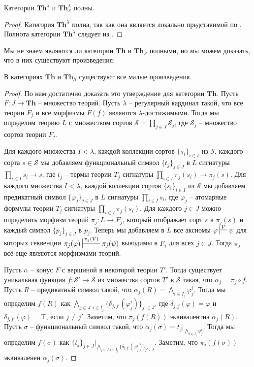 \documentclass[reqno]{amsart}
\theoremstyle{definition}
\theoremstyle{remark}
\newcommand{\bcat}[1]{\mathbf{#1}}
\newcommand{\Th}{\bcat{Th}}
\begin{document}
\begin{prop}
Категории $\Th^\lambda$ и $\Th_\mathcal{S}^\lambda$ полны.
\end{prop}
\begin{proof}
Категория $\Th^\lambda$ полна, так как она является локально представимой по .
Полнота категории $\Th^\lambda$ следует из .
\end{proof}

Мы не знаем являются ли категории $\Th$ и $\Th_\mathcal{S}$ полными, но мы можем доказать, что в них существуют произведения:

\begin{prop}
В категориях $\Th$ и $\Th_\mathcal{S}$ существуют все малые произведения.
\end{prop}
\begin{proof}
По  нам достаточно доказать это утверждение для категории $\Th$.
Пусть $F : J \to \Th$ -- множество теорий.
Пусть $\lambda$ -- регулярный кардинал такой, что все теории $F_j$ и все морфизмы $F(f)$ являются $\lambda$-достижимыми.
Тогда мы определим теорию $L$ с множеством сортов $\mathcal{S} = \prod_{j \in J} \mathcal{S}_j$, где $\mathcal{S}_j$ -- множество сортов теории $F_j$.

Для каждого множества $I < \lambda$, каждой коллекции сортов $\{ s_i \}_{i \in I}$ из $\mathcal{S}$, каждого сорта $s \in \mathcal{S}$ мы добавляем функциональный символ $\{ t_j \}_{j \in J}$ в $L$ сигнатуры $\prod_{i \in I} s_i \to s$,
где $t_j$ -- термы теории $T_j$ сигнатуры $\prod_{i \in I} \pi_j(s_i) \to \pi_j(s)$.
Для каждого множества $I < \lambda$, каждой коллекции сортов $\{ s_i \}_{i \in I}$ из $\mathcal{S}$ мы добавляем предикатный символ $\{ \varphi_j \}_{j \in J}$ в $L$ сигнатуры $\prod_{i \in I} s_i$,
где $\varphi_j$ -- атомарные формулы теории $T_j$ сигнатуры $\prod_{i \in I} \pi_j(s_i)$.
Для каждого $j \in J$ можно определить морфизм теорий $\pi_j : L \to F_j$, который отображает сорт $s$ в $\pi_j(s)$ и каждый символ $\{ p_j \}_{j \in J}$ в $p_j$.
Теперь мы добавляем в $L$ все аксиомы $\varphi \sststile{}{V} \psi$ для которых секвенции $\pi_j(\varphi) \sststile{}{\pi_j(V)} \pi_j(\psi)$ выводимы в $F_j$ для всех $j \in J$.
Тогда $\pi_j$ всё еще являются морфизмами теорий.

Пусть $\alpha$ -- конус $F$ с вершиной в некоторой теории $T'$.
Тогда существует уникальная функция $f : \mathcal{S}' \to \mathcal{S}$ из множества сортов $T'$ в $\mathcal{S}$ такая, что $\alpha_j = \pi_j \circ f$.
Пусть $R$ -- предикатный символ такой, что $\alpha_j(R) = \bigwedge_{i \in I_j} \varphi^i_j$.
Тогда мы определим $f(R)$ как $\bigwedge_{j \in J, i \in I_j} \{ \delta_{j,j'}(\varphi^i_j) \}_{j' \in J}$, где $\delta_{j,j}(\varphi) = \varphi$ и $\delta_{j,j'}(\varphi) = \top$, если $j \neq j'$.
Заметим, что $\pi_j(f(R))$ эквивалентна $\alpha_j(R)$.
Пусть $\sigma$ -- функциональный символ такой, что $\alpha_j(\sigma) = t_j|_{\bigwedge_{i \in I_j} \varphi^i_j}$.
Тогда мы определим $f(\sigma)$ как $\{ t_j \}_{j \in J}|_{\bigwedge_{j \in J, i \in I_j} \{ \delta_{j,j'}(\varphi^i_j) \}_{j' \in J}}$.
Заметим, что $\pi_j(f(\sigma))$ эквиваленен $\alpha_j(\sigma)$.


\end{proof}
\end{document}
